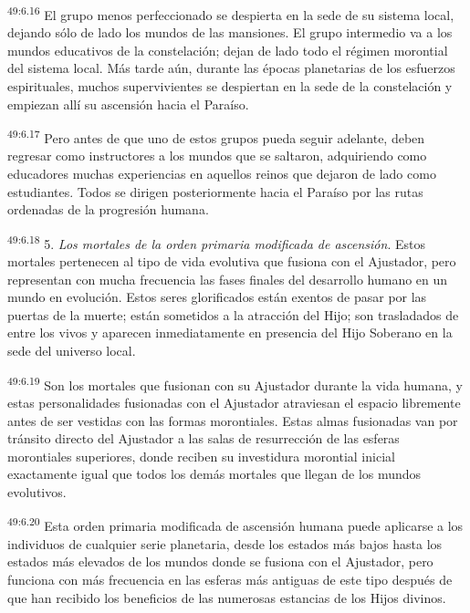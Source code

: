 \par
\textsuperscript{49:6.16} El grupo menos perfeccionado se despierta en la sede de su sistema local, dejando sólo de lado los mundos de las mansiones. El grupo intermedio va a los mundos educativos de la constelación; dejan de lado todo el régimen morontial del sistema local. Más tarde aún, durante las épocas planetarias de los esfuerzos espirituales, muchos supervivientes se despiertan en la sede de la constelación y empiezan allí su ascensión hacia el Paraíso.

\par
\textsuperscript{49:6.17} Pero antes de que uno de estos grupos pueda seguir adelante, deben regresar como instructores a los mundos que se saltaron, adquiriendo como educadores muchas experiencias en aquellos reinos que dejaron de lado como estudiantes. Todos se dirigen posteriormente hacia el Paraíso por las rutas ordenadas de la progresión humana.

\par
\textsuperscript{49:6.18} 5. \textit{Los mortales de la orden primaria modificada de ascensión}. Estos mortales pertenecen al tipo de vida evolutiva que fusiona con el Ajustador, pero representan con mucha frecuencia las fases finales del desarrollo humano en un mundo en evolución. Estos seres glorificados están exentos de pasar por las puertas de la muerte; están sometidos a la atracción del Hijo; son trasladados de entre los vivos y aparecen inmediatamente en presencia del Hijo Soberano en la sede del universo local.

\par
\textsuperscript{49:6.19} Son los mortales que fusionan con su Ajustador durante la vida humana, y estas personalidades fusionadas con el Ajustador atraviesan el espacio libremente antes de ser vestidas con las formas morontiales. Estas almas fusionadas van por tránsito directo del Ajustador a las salas de resurrección de las esferas morontiales superiores, donde reciben su investidura morontial inicial exactamente igual que todos los demás mortales que llegan de los mundos evolutivos.

\par
\textsuperscript{49:6.20} Esta orden primaria modificada de ascensión humana puede aplicarse a los individuos de cualquier serie planetaria, desde los estados más bajos hasta los estados más elevados de los mundos donde se fusiona con el Ajustador, pero funciona con más frecuencia en las esferas más antiguas de este tipo después de que han recibido los beneficios de las numerosas estancias de los Hijos divinos.

